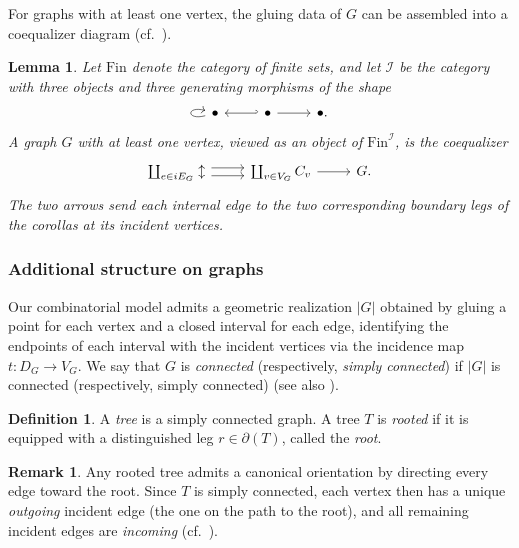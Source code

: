 \documentclass{amsart}
\newtheorem{lemma}[theorem]{Lemma}%
\theoremstyle{definition}
\newtheorem{definition}[theorem]{Definition}%
\newtheorem{remark}[theorem]{Remark}%
\numberwithin{equation}{section}
\begin{document}
For graphs with at least one vertex, the gluing data of $G$ can be assembled into a coequalizer diagram (cf.\ \cite[Construction~1.18]{hry1}).

\begin{lemma}\label{lem:coequalizer-graph}
Let $\mathrm{Fin}$ denote the category of finite sets, and let $\mathscr{I}$ be the category with three objects and three generating morphisms of the shape
\[
\begin{tikzcd}
\arrow[loop left] \bullet & \bullet \arrow[l, hook'] \arrow[r] & \bullet .
\end{tikzcd}
\]
A graph $G$ with at least one vertex, viewed as an object of $\mathrm{Fin}^{\mathscr I}$, is the coequalizer
\[
\begin{tikzcd}
\coprod_{e\in iE_G}\updownarrow \arrow[r, shift left=1.2] \arrow[r, shift right=1.2] & \coprod_{v\in V_G} C_v \arrow[r] & G .
\end{tikzcd}
\]
The two arrows send each internal edge to the two corresponding boundary legs of the corollas at its incident vertices.
\end{lemma}

\subsubsection{Additional structure on graphs}
Our combinatorial model admits a geometric realization $|G|$ obtained by gluing a point for each vertex and a closed interval for each edge, identifying the endpoints of each interval with the incident vertices via the incidence map $t:D_G\to V_G$. We say that $G$ is \emph{connected} (respectively, \emph{simply connected}) if $|G|$ is connected (respectively, simply connected) (see also \cite[Definition~1.7]{hry1}).

\begin{definition}\label{def: tree}
A \emph{tree} is a simply connected graph. A tree $T$ is \emph{rooted} if it is equipped with a distinguished leg $r\in \partial(T)$, called the \emph{root}.
\end{definition}

\begin{remark}
Any rooted tree admits a canonical orientation by directing every edge toward the root. Since $T$ is simply connected, each vertex then has a unique \emph{outgoing} incident edge (the one on the path to the root), and all remaining incident edges are \emph{incoming} (cf.\ \cite[Definition~3.4]{hackney2022segal}).
\end{remark}
\end{document}
